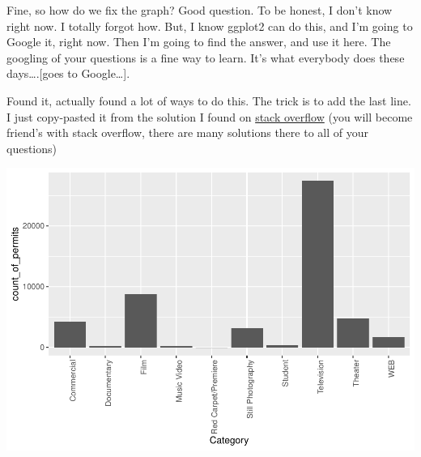 \documentclass[]{book}
\newenvironment{Shaded}{\begin{snugshade}}{\end{snugshade}}
\newcommand{\KeywordTok}[1]{\textcolor[rgb]{0.13,0.29,0.53}{\textbf{#1}}}
\newcommand{\DataTypeTok}[1]{\textcolor[rgb]{0.13,0.29,0.53}{#1}}
\newcommand{\DecValTok}[1]{\textcolor[rgb]{0.00,0.00,0.81}{#1}}
\newcommand{\StringTok}[1]{\textcolor[rgb]{0.31,0.60,0.02}{#1}}
\newcommand{\OperatorTok}[1]{\textcolor[rgb]{0.81,0.36,0.00}{\textbf{#1}}}
\newcommand{\NormalTok}[1]{#1}
\begin{document}
Fine, so how do we fix the graph? Good question. To be honest, I don't
know right now. I totally forgot how. But, I know ggplot2 can do this,
and I'm going to Google it, right now. Then I'm going to find the
answer, and use it here. The googling of your questions is a fine way to
learn. It's what everybody does these days\ldots{}.{[}goes to
Google\ldots{}{]}.

Found it, actually found a lot of ways to do this. The trick is to add
the last line. I just copy-pasted it from the solution I found on
\href{https://stackoverflow.com/questions/1330989/rotating-and-spacing-axis-labels-in-ggplot2}{stack
overflow} (you will become friend's with stack overflow, there are many
solutions there to all of your questions)

\begin{Shaded}
\end{Shaded}

\includegraphics{Statistics_Lab_files/figure-latex/1categoryB-1.pdf}
\end{document}
